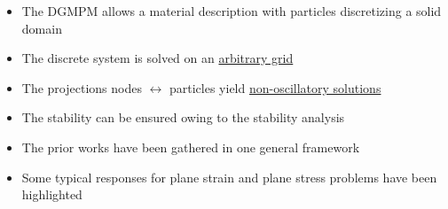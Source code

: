\documentclass[11pt,aspectratio=169]{beamer}
\begin{document}
\begin{frame}[standout]{}
  \begin{footnotesize}
    \begin{block}{}
      \begin{itemize}
      \item[] The DGMPM allows a material description with particles discretizing a solid domain
      \item[] The discrete system is solved on an \underline{arbitrary grid}
      \item[] The projections nodes $\leftrightarrow$ particles yield \underline{non-oscillatory solutions}
      \item[] The stability can be ensured owing to the stability analysis
      \end{itemize}

  \end{block}

  \begin{block}{}
    \begin{itemize}
    \item[] The prior works have been gathered in one general framework
    \item[] Some typical responses for plane strain and plane stress problems have been highlighted
    \end{itemize}
  \end{block}

  \end{footnotesize}
\end{frame}
\end{document}
